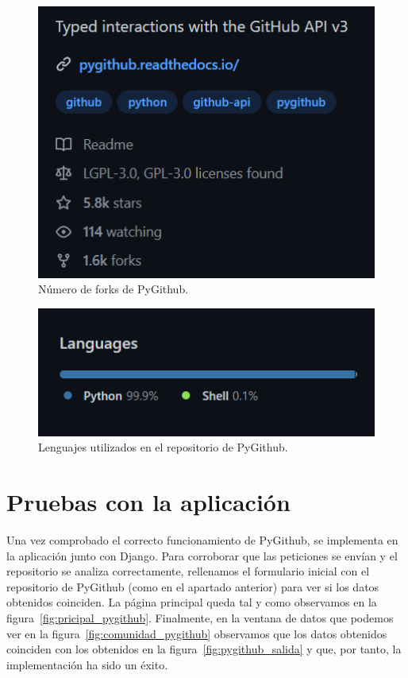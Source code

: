 \documentclass[a4paper, 12pt]{book}
\begin{document}
\begin{figure}
    \centering
    \includegraphics[width=1\textwidth, keepaspectratio]{img/pygithub_forks.png}
    \caption{Número de forks de PyGithub.}\label{fig:pygithub_forks}
\end{figure}

\begin{figure}
    \centering
    \includegraphics[width=1\textwidth, keepaspectratio]{img/pygithub_lenguajes.png}
    \caption{Lenguajes utilizados en el repositorio de PyGithub.}\label{fig:pygithub_lenguajes}
\end{figure}

\section{Pruebas con la aplicación}

Una vez comprobado el correcto funcionamiento de PyGithub, se implementa en la aplicación junto con Django. Para corroborar que las peticiones se envían y el repositorio se analiza correctamente, rellenamos el formulario inicial con el repositorio de PyGithub (como en el apartado anterior) para ver si los datos obtenidos coinciden. La página principal queda tal y como observamos en la figura~\ref{fig:pricipal_pygithub}. Finalmente, en la ventana de datos que podemos ver en la figura~\ref{fig:comunidad_pygithub} observamos que los datos obtenidos coinciden con los obtenidos en la figura~\ref{fig:pygithub_salida} y que, por tanto, la implementación ha sido un éxito.
\end{document}
